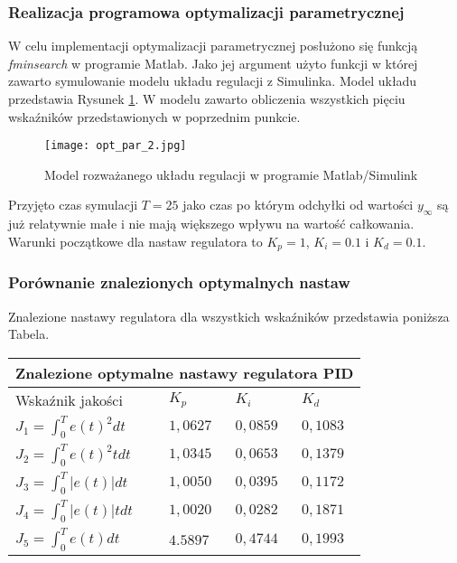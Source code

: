 \documentclass[a4paper,11pt]{article}
\begin{document}
\subsubsection{Realizacja programowa optymalizacji parametrycznej}
W celu implementacji optymalizacji parametrycznej posłużono się funkcją \textit{fminsearch} w programie Matlab. Jako jej argument użyto funkcji w której zawarto symulowanie modelu układu regulacji z Simulinka. Model układu przedstawia Rysunek \ref{fig:opt_par_2}. W modelu zawarto obliczenia wszystkich pięciu wskaźników przedstawionych w poprzednim punkcie. 
\begin{figure}[H]
\centerline{\texttt{[image: opt\_par\_2.jpg]}}
\caption{Model rozważanego układu regulacji w programie Matlab/Simulink}
\label{fig:opt_par_2}
\end{figure}

Przyjęto czas symulacji \(T=25\) jako czas po którym odchyłki od wartości \(y_{\infty}\) są już relatywnie małe i nie mają większego wpływu na wartość całkowania. Warunki początkowe dla nastaw regulatora to \( K_{p} = 1 \), \(K_{i}=0.1\) i \(K_{d}=0.1\).
\subsubsection{Porównanie znalezionych optymalnych nastaw}
Znalezione nastawy regulatora dla wszystkich wskaźników przedstawia poniższa Tabela.
\begin{table}[H]
\begin{center}
\begin{tabular}{|l|p{2cm}|p{2cm}|p{2cm}|}
\hline
\multicolumn{4}{|c|}{\textbf{Znalezione optymalne nastawy regulatora PID}} 
\\ \hline 
Wskaźnik jakości & \( K_{p} \) & \( K_{i} \) & \( K_{d} \) 
\\ \hline
\( J_{1} = \int_{0}^{T}e(t)^{2}dt \) & \(1,0627\) & \( 0,0859 \) & \( 0,1083\) 
\\ \hline
\( J_{2} = \int_{0}^{T}e(t)^{2}tdt \) & \( 1,0345 \) & \( 0,0653 \) & \( 0,1379 \) 
\\ \hline
\( J_{3} = \int_{0}^{T}|e(t)|dt \) & \( 1,0050 \) & \( 0,0395 \) & \( 0,1172 \) 
\\ \hline
\( J_{4} = \int_{0}^{T}|e(t)|tdt \) & \( 1,0020 \) & \( 0,0282 \) & \( 0,1871 \) 
\\ \hline
\( J_{5} = \int_{0}^{T}e(t)dt \) & \( 4.5897 \) & \( 0,4744 \) & \( 0,1993 \) 
\\ \hline

\end{tabular}
\end{center}
\end{table}
\end{document}
